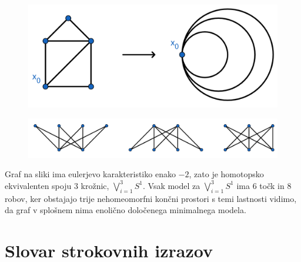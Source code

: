\documentclass[mat1]{fmfdelo}
\DeclareRobustCommand{\h}{
    \mathcal{H}
}
\DeclareRobustCommand{\pot}{
    $\h-$pot
}
\begin{document}
\begin{primer}
    \begin{figure}[h]
        \centering
        \includegraphics[width=0.55\linewidth]{v3.png}
    \end{figure}
    \begin{figure}[h]
        \centering
        \includegraphics[width=0.8\linewidth]{grafi.png}
    \end{figure}

    Graf na sliki ima eulerjevo karakteristiko enako $-2$, zato je homotopsko ekvivalenten spoju $3$ krožnic, $\bigvee\limits_{i=1}^{3}S^1$. Vsak model za $\bigvee\limits_{i=1}^{3}S^1$ ima $6$ točk in $8$ robov, ker obstajajo trije nehomeomorfni končni prostori s temi lastnosti vidimo, da graf v splošnem nima enolično določenega minimalnega modela.
\end{primer}
\geslo{$\h-$path}{\pot}


\nocite{*}

%

\tableofcontents
\section*{Slovar strokovnih izrazov}
\end{document}
